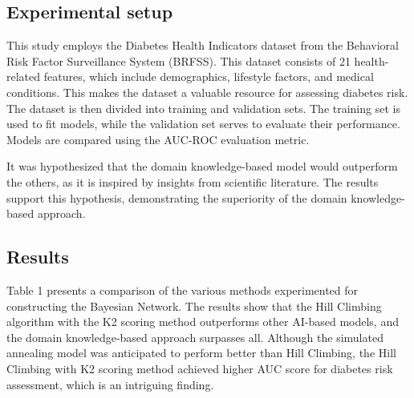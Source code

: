 \documentclass[letterpaper]{article}
\begin{document}
\subsection{Experimental setup}

This study employs the Diabetes Health Indicators dataset from the Behavioral Risk Factor Surveillance System (BRFSS). This dataset consists of 21 health-related features, which include demographics, lifestyle factors, and medical conditions. This makes the dataset a valuable resource for assessing diabetes risk. The dataset is then divided into training and validation sets. The training set is used to fit models, while the validation set serves to evaluate their performance. Models are compared using the AUC-ROC evaluation metric.



It was hypothesized that the domain knowledge-based model would outperform the others, as it is inspired by insights from scientific literature. The results support this hypothesis, demonstrating the superiority of the domain knowledge-based approach. 

\subsection{Results}

Table 1 presents a comparison of the various methods experimented for constructing the Bayesian Network. The results show that the Hill Climbing algorithm with the K2 scoring method outperforms other AI-based models, and the domain knowledge-based approach surpasses all. Although the simulated annealing model was anticipated to perform better than Hill Climbing, the Hill Climbing with K2 scoring method achieved higher AUC score for diabetes risk assessment, which is an intriguing finding.
\end{document}
